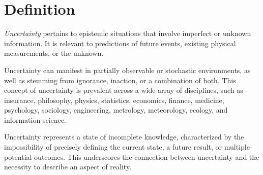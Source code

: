 \section{Definition}

\begin{definition}
    \emph{Uncertainty} pertains to epistemic situations that involve imperfect or unknown information. 
    It is relevant to predictions of future events, existing physical measurements, or the unknown.
\end{definition}
Uncertainty can manifest in partially observable or stochastic environments, as well as stemming from ignorance, inaction, or a combination of both. 
This concept of uncertainty is prevalent across a wide array of disciplines, such as insurance, philosophy, physics, statistics, economics, finance, medicine, psychology, sociology, engineering, metrology, meteorology, ecology, and information science.

Uncertainty represents a state of incomplete knowledge, characterized by the impossibility of precisely defining the current state, a future result, or multiple potential outcomes. 
This underscores the connection between uncertainty and the necessity to describe an aspect of reality.